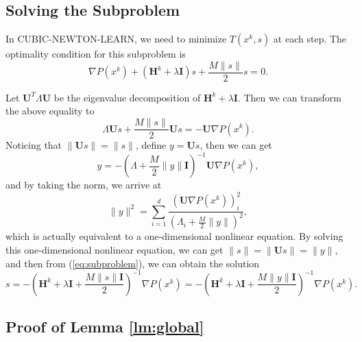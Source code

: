\documentclass[10pt]{article}
\newcommand{\mH}{\mathbf{H}}
\newcommand{\mI}{\mathbf{I}}
\newcommand{\mU}{\mathbf{U}}
\begin{document}

\subsection{Solving the Subproblem}\label{sec:subproblem}

In {\sf CUBIC-NEWTON-LEARN}, we need to minimize $T(x^k, s)$ at each step. The optimality condition for this subproblem is 
\begin{equation}\label{eq:subproblem}
\nabla P(x^k) + (\mH^k + \lambda \mI)s + \frac{M\|s\|}{2}s = 0. 
\end{equation}

Let $\mU^T \Lambda \mU$ be the eigenvalue decomposition of $\mH^k + \lambda \mI$. Then we can transform the above equality to 
$$
\Lambda \mU s + \frac{M\|s\|}{2} \mU s = - \mU \nabla P(x^k). 
$$
Noticing that $\| \mU s\| = \|s\|$, define $y = \mU s$, then we can get 
$$
y = - \left(  \Lambda + \frac{M}{2}\|y\|\mI  \right)^{-1} \mU \nabla P(x^k), 
$$
and by taking the norm, we arrive at 
$$
\|y\|^2 = \sum_{i=1}^d \frac{\left(  \mU\nabla P(x^k)  \right)_i^2 }{(\Lambda_i + \frac{M}{2}\|y\|)^2}, 
$$
which is actually equivalent to a one-dimensional nonlinear equation. By solving this one-dimensional nonlinear equation, we can get $\|s\| = \|\mU s\| = \|y\|$, and then from (\ref{eq:subproblem}), we can obtain the solution 
$$
s = - \left(  \mH^k + \lambda \mI + \frac{M\|s\|\mI}{2}  \right)^{-1} \nabla P(x^k) = - \left(  \mH^k + \lambda \mI + \frac{M\|y\|\mI}{2}  \right)^{-1} \nabla P(x^k). 
$$





\subsection{Proof of Lemma \ref{lm:global}}
\end{document}
